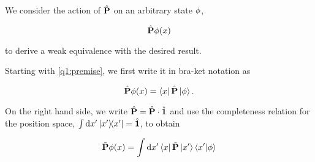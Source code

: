 
We consider the action of $\hat{\textbf{P}}$ on an arbitrary
state $\phi$, 

\begin{equation}
    \hat{\textbf{P}} \phi(x) 
    \label{q1:premise}
\end{equation}

to derive a weak equivalence with the desired result.

Starting with \cref{q1:premise}, we first write it in
bra-ket notation as

\begin{equation}
    \hat{\textbf{P}} \phi(x) = 
        \bra{x} \hat{\textbf{P}} \ket{\phi}.
\end{equation}

On the right hand side, we write $\hat{\textbf{P}} = \hat{\textbf{P}} \cdot \hat{\textbf{1}}$
and use the completeness relation for the position space,
$\int \dd{x'} \ketbra{x'}{x'} = \hat{\textbf{1}}$,
to obtain

\begin{equation}
    \hat{\textbf{P}} \phi(x) = \int \dd{x'} \bra{x} 
                                        \hat{\textbf{P}} \ket{x'}
                                        \braket{x'}{\phi}
\end{equation}

